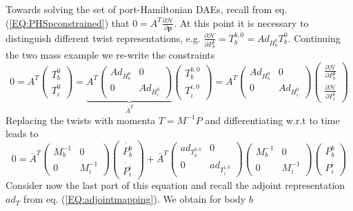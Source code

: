 \documentclass[a4paper,twoside, openright,12pt]{report}
\newcommand{\f}[1]{\boldsymbol{#1}}
\begin{document}
{Towards solving the set of port-Hamiltonian DAEs, recall from eq. (\ref{EQ:PHSpconstrained}) that $0=A^T\frac{\partial \mathcal{H}}{\partial \f{p}}$. At this point it is necessary to distinguish different twist representations, e.g. $\frac{\partial \mathcal{H}}{\partial P_b^b} = T_b^{b,0} = Ad_{H_0^b}T_b^0 $. Continuing the two mass example we re-write the constraints
\begin{equation}
0 = A^T \begin{pmatrix}T_b^0 \\ T_i^0 \end{pmatrix}
 = \underbrace{A^T \begin{pmatrix}
Ad_{H_b^0} & 0 \\ 0 & Ad_{H_i^0}\end{pmatrix}}_{\bar{A}^T}
\begin{pmatrix}
T_b^{b,0} \\ T_i^{i,0}\end{pmatrix} = A^T \begin{pmatrix}
Ad_{H_b^0} & 0 \\ 0 & Ad_{H_i^0}\end{pmatrix}
\begin{pmatrix}
\frac{\partial \mathcal{H}}{\partial P_b^b} \\
\frac{\partial \mathcal{H}}{\partial P_i^i}
\end{pmatrix}
\end{equation}
Replacing the twists with momenta $T = M^{-1}P$ and differentiating w.r.t to time leads to
\begin{equation}
0 = \bar{A}^T\begin{pmatrix}M_b^{-1} & 0 \\ 0 & M_i^{-1}\end{pmatrix} \begin{pmatrix}\dot{P_b^b} \\ \dot{P_i^i}\end{pmatrix}
 +
\bar{A}^T \begin{pmatrix}ad_{T_b^{b,0}} & 0 \\
0 & ad_{T_i^{i,0}}\end{pmatrix}\begin{pmatrix}M_b^{-1} & 0 \\ 0 & M_i^{-1}\end{pmatrix} \begin{pmatrix}P_b^b \\ P_i^i\end{pmatrix}
\end{equation}
Consider now the last part of this equation and recall the adjoint representation $ad_T$ from eq. (\ref{EQ:adjointmapping}). We obtain for body $b$
}
\end{document}
